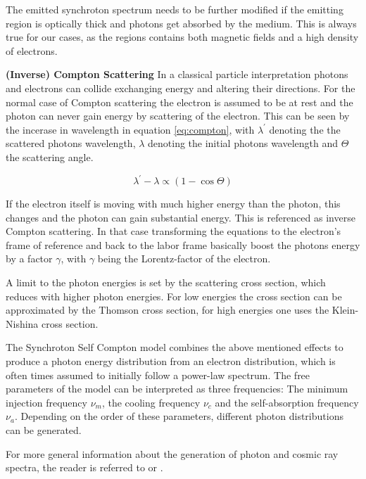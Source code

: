The emitted synchroton spectrum needs to be further modified 
if the emitting region is optically thick and photons 
get absorbed by the medium.
This is always true for our cases, as the regions contains 
both magnetic fields and a high density of electrons.

\textbf{(Inverse) Compton Scattering}
In a classical particle interpretation photons and electrons 
can collide exchanging energy and altering their directions.
For the normal case of Compton scattering the electron 
is assumed to be at rest and the photon can never gain 
energy by scattering of the electron.
This can be 
seen by the incerase in wavelength in equation \ref{eq:compton},
with $\lambda^{\prime}$ denoting the the scattered photons 
wavelength, $\lambda$ denoting the initial photons wavelength  
and $\Theta$ the scattering angle.

\begin{equation}
	\lambda^{\prime} - \lambda  \propto \left(1-\cos{\Theta} \right)
	\label{eq:compton}
\end{equation}


If the electron itself is moving with much higher energy
than the photon, this changes and the photon can gain substantial energy.
This is referenced as inverse Compton scattering.
In that case transforming the equations to the 
electron's frame of reference and back to the labor frame 
basically boost the photons energy by a factor $\gamma$, 
with $\gamma$ being the Lorentz-factor of the electron.

A limit to the photon energies is set by the scattering cross
section, which reduces with higher photon energies.
For low energies the cross section can be approximated by 
the Thomson cross section, for high energies
one uses the Klein-Nishina cross section.

The Synchroton Self Compton model combines the above mentioned
effects to produce a photon energy distribution from an
electron distribution, which is often times assumed to
initially follow a power-law spectrum.
The free parameters of the model can be interpreted as 
three frequencies: The minimum injection frequency $\nu_m$, 
the cooling frequency $\nu_c$ and the self-absorption frequency $\nu_a$.
Depending on the order of these parameters, different 
photon distributions can be generated.

For more general information about the generation of photon 
and cosmic ray spectra, the reader is referred to 
\cite{gaisser_engel_resconi_2016}
or
\cite{bookap}.

